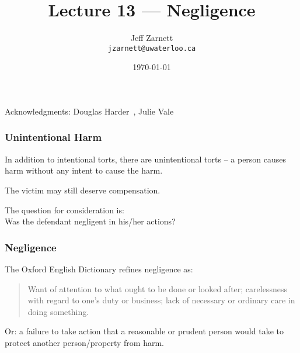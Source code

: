 

\title{Lecture 13 --- Negligence }

\author{Jeff Zarnett \\ \small \texttt{jzarnett@uwaterloo.ca}}
\date{\today}




\begin{frame}
  \titlepage

\begin{center}
  \small{Acknowledgments: Douglas Harder~\cite{dwh}, Julie Vale~\cite{jv}}
  \end{center}
\end{frame}



\begin{frame}
\frametitle{Unintentional Harm}

In addition to intentional torts, there are unintentional torts -- a person causes harm without any intent to cause the harm.

The victim may still deserve compensation.

The question for consideration is:\\
\quad Was the defendant \alert{negligent} in his/her actions?

\end{frame}



\begin{frame}
\frametitle{Negligence}

The Oxford English Dictionary refines negligence as:

\begin{quote}
Want of attention to what ought to be done or looked after; carelessness with regard to one's duty or business; lack of necessary or ordinary care in doing something.
\end{quote}

Or: a failure to take action that a reasonable or prudent person would take to protect another person/property from harm.

\end{frame}



